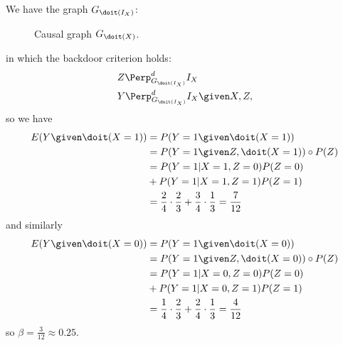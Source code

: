 \begin{enumerate}[label=8.\arabic*]
    \begin{ungradedsolution}
        We have the graph $G_{\doit(I_X)}$:
        \begin{figure}[!ht]
            \centering
            \caption{Causal graph $G_{\doit(X)}$.}
            \label{fig:two}
        \end{figure}

        in which the backdoor criterion holds:
        \begin{align*}
             & Z\Perp^d_{G_{\doit(I_X)}} I_X             \\
             & Y\Perp^d_{G_{\doit(I_X)}} I_X\given X, Z,
        \end{align*}
        so we have
        \begin{align*}
            E(Y\given \doit(X=1)) & = P(Y=1\given \doit(X=1))                                                  \\
                                  & = P(Y=1\given Z, \doit(X=1))\circ P(Z)                                     \\
                                  & = P(Y=1 | X=1, Z=0)P(Z=0)                                                  \\
                                  & + P(Y=1 | X=1, Z=1)P(Z=1)                                                  \\
                                  & = \frac{2}{4}\cdot\frac{2}{3} + \frac{3}{4}\cdot\frac{1}{3} = \frac{7}{12}
        \end{align*}
        and similarly
        \begin{align*}
            E(Y\given \doit(X=0)) & = P(Y=1\given \doit(X=0))                                                  \\
                                  & = P(Y=1\given Z, \doit(X=0))\circ P(Z)                                     \\
                                  & = P(Y=1 | X=0, Z=0)P(Z=0)                                                  \\
                                  & + P(Y=1 | X=0, Z=1)P(Z=1)                                                  \\
                                  & = \frac{1}{4}\cdot\frac{2}{3} + \frac{2}{4}\cdot\frac{1}{3} = \frac{4}{12}
        \end{align*}
        so $\beta = \frac{3}{12} \approx 0.25$.
    \end{ungradedsolution}


\end{enumerate}
